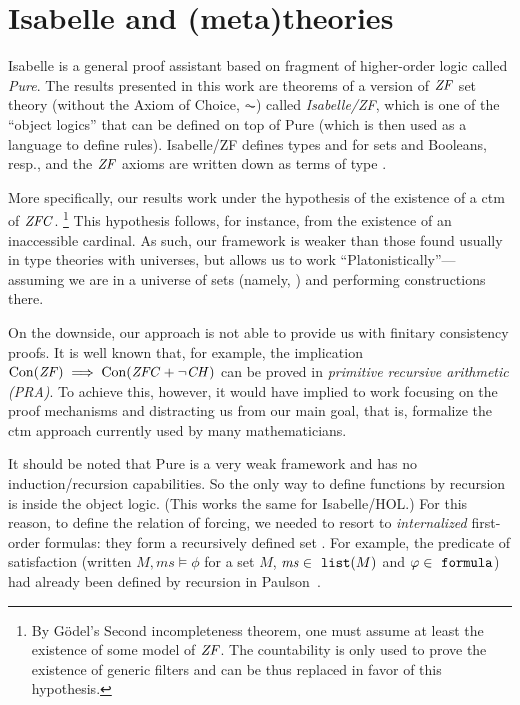 \section{Isabelle and (meta)theories}
\label{sec:isabelle-metatheories}

Isabelle \cite{Isabelle,DBLP:books/sp/Paulson94} is a general proof
assistant based on fragment of higher-order logic called
\emph{Pure}. 
The results presented in this work are theorems of a
version of $\mathit{ZF}$ set theory (without the Axiom of Choice, $\AC$) 
called \emph{Isabelle/ZF}, which is one of the
``object logics'' that can be defined on top of Pure (which is then
used as a language to define rules). Isabelle/ZF defines types
 and  for sets and Booleans, resp., and the $\mathit{ZF}$
axioms are written down as terms of type .

More specifically, our results work under the hypothesis of
the existence of a ctm of $\mathit{ZFC}$.%
\footnote{By Gödel's Second incompleteness theorem, one must assume at
  least the existence of some model of $\mathit{ZF}$. 
  The countability is only used to prove the existence of
  generic filters and can be thus replaced in favor of this
  hypothesis.} 
This hypothesis follows, for instance, from the existence of an
inaccessible cardinal. As such, our framework is weaker than those
found usually in type theories with universes, but allows us to work
``Platonistically''--- assuming we are in a universe of sets (namely,
) and performing constructions there.

On the downside, our approach is not able to provide us with finitary
consistency proofs. It is well known that, for example, the
implication $\operatorname{Con}(\mathit{ZF}) \implies \operatorname{Con}(\mathit{ZFC}+\neg\mathit{CH})$ can be proved in
\emph{primitive recursive arithmetic (PRA)}. To achieve this, however,
it would have implied to work focusing on the proof mechanisms
and distracting us from our main goal, that is, formalize the ctm
approach currently used by many mathematicians.

It should be noted that Pure is a very weak framework and has no
induction/recursion capabilities. So the only way to define functions
by recursion is inside the object logic. (This works the same for
Isabelle/HOL.) For this reason, to define the relation of forcing, we
needed to resort to \emph{internalized} first-order formulas: they
form a recursively defined set . For example, the
predicate of satisfaction
(written $M,\mathit{ms}\models\phi$ for a set $M$,
$\mathit{ms}\in\isatt{list}(M)$ and $\phi\in\formula$)
had already been defined by recursion in Paulson~\cite{paulson_2003}.


